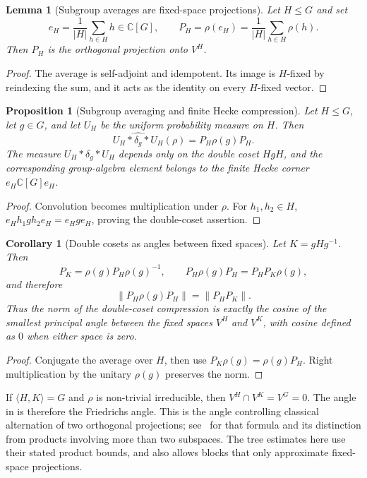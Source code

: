 \documentclass[11pt]{amsart}
\newtheorem{lemma}[lemma]{Lemma}
\newtheorem{proposition}[proposition]{Proposition}
\newtheorem{corollary}[corollary]{Corollary}
\theoremstyle{definition}
\theoremstyle{remark}
\theoremstyle{plain}
\theoremstyle{plain}
\numberwithin{equation}{section}
\newcommand{\norm}[1]{\lVert #1 \rVert}
\newcommand{\abs}[1]{\lvert #1 \rvert}
\newcommand{\opn}[1]{\norm{#1}}
\newcommand{\C}{\mathbb{C}}
\begin{document}
\begin{lemma}[Subgroup averages are fixed-space projections]
\label{lem:subgroup-average}
Let $H\le G$ and set
\[
  e_H=\frac1{\abs H}\sum_{h\in H}h\in\C[G],
  \qquad
  P_H=\rho(e_H)=\frac1{\abs H}\sum_{h\in H}\rho(h).
\]
Then $P_H$ is the orthogonal projection onto $V^H$.
\end{lemma}

\begin{proof}
The average is self-adjoint and idempotent. Its image is $H$-fixed by
reindexing the sum, and it acts as the identity on every $H$-fixed vector.
\end{proof}

\begin{proposition}[Subgroup averaging and finite Hecke compression]
\label{prop:hecke-compression}
Let $H\le G$, let $g\in G$, and let $U_H$ be the uniform probability measure on $H$. Then
\[
  \widehat{U_H*\delta_g*U_H}(\rho)=P_H\rho(g)P_H .
\]
The measure $U_H*\delta_g*U_H$ depends only on the double coset $HgH$, and the corresponding
group-algebra element belongs to the finite Hecke corner $e_H\C[G]e_H$.
\end{proposition}

\begin{proof}
Convolution becomes multiplication under $\rho$. For $h_1,h_2\in H$,
$e_Hh_1gh_2e_H=e_Hge_H$, proving the double-coset assertion.
\end{proof}

\begin{corollary}[Double cosets as angles between fixed spaces]
\label{cor:double-coset-angle}
Let $K=gHg^{-1}$. Then
\[
  P_K=\rho(g)P_H\rho(g)^{-1},
  \qquad
  P_H\rho(g)P_H=P_HP_K\rho(g),
\]
and therefore
\[
  \opn{P_H\rho(g)P_H}=\opn{P_HP_K}.
\]
Thus the norm of the double-coset compression is exactly the cosine of the smallest principal
angle between the fixed spaces $V^H$ and $V^K$, with cosine defined as $0$ when either space is zero.
\end{corollary}

\begin{proof}
Conjugate the average over $H$, then use $P_K\rho(g)=\rho(g)P_H$.
Right multiplication by the unitary $\rho(g)$ preserves the norm.
\end{proof}

If $\langle H,K\rangle=G$ and $\rho$ is non-trivial irreducible, then
$V^H\cap V^K=V^G=0$. The angle in
 is therefore the Friedrichs angle. This is
the angle controlling classical alternation of two orthogonal projections;
see~\cite{BadeaGrivauxMuller2010} for that formula and its distinction from
products involving more than two subspaces. The tree estimates here use
their stated product bounds, and  also allows
blocks that only approximate fixed-space projections.
\end{document}
